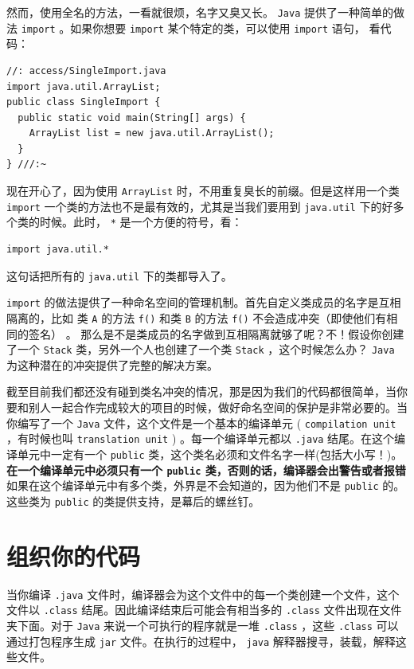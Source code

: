 \documentclass[10pt,a4paper,UTF8]{article}
\begin{document}
然而，使用全名的方法，一看就很烦，名字又臭又长。 \texttt{Java} 提供了一种简单的做法 \texttt{import} 。如果你想要 \texttt{import} 某个特定的类，可以使用 \texttt{import} 语句， 看代码：
\lstset{language=C,label= ,caption= ,captionpos=b,numbers=none}
\begin{lstlisting}
//: access/SingleImport.java
import java.util.ArrayList;
public class SingleImport {
  public static void main(String[] args) {
    ArrayList list = new java.util.ArrayList();
  }
} ///:~
\end{lstlisting}

现在开心了，因为使用 \texttt{ArrayList} 时，不用重复臭长的前缀。但是这样用一个类 \texttt{import} 一个类的方法也不是最有效的，尤其是当我们要用到 \texttt{java.util} 下的好多个类的时候。此时， \texttt{*} 是一个方便的符号，看：
\begin{verbatim}
import java.util.*
\end{verbatim}
这句话把所有的 \texttt{java.util} 下的类都导入了。

\texttt{import} 的做法提供了一种命名空间的管理机制。首先自定义类成员的名字是互相隔离的，比如 类 \texttt{A} 的方法 \texttt{f()} 和类 \texttt{B} 的方法 \texttt{f()} 不会造成冲突（即使他们有相同的签名） 。 那么是不是类成员的名字做到互相隔离就够了呢？不！假设你创建了一个 \texttt{Stack} 类，另外一个人也创建了一个类 \texttt{Stack} ，这个时候怎么办？ \texttt{Java} 为这种潜在的冲突提供了完整的解决方案。

截至目前我们都还没有碰到类名冲突的情况，那是因为我们的代码都很简单，当你要和别人一起合作完成较大的项目的时候，做好命名空间的保护是非常必要的。当你编写了一个 \texttt{Java} 文件，这个文件是一个基本的编译单元 ( \texttt{compilation unit} ，有时候也叫 \texttt{translation unit} ) 。每一个编译单元都以 \texttt{.java} 结尾。在这个编译单元中一定有一个 \texttt{public} 类，这个类名必须和文件名字一样(包括大小写！)。 \textbf{在一个编译单元中必须只有一个 \texttt{public} 类，否则的话，编译器会出警告或者报错} 如果在这个编译单元中有多个类，外界是不会知道的，因为他们不是 \texttt{public} 的。这些类为 \texttt{public} 的类提供支持，是幕后的螺丝钉。
\section{组织你的代码}
\label{sec:orgf824f1e}


当你编译 \texttt{.java} 文件时，编译器会为这个文件中的每一个类创建一个文件，这个文件以 \texttt{.class} 结尾。因此编译结束后可能会有相当多的 \texttt{.class} 文件出现在文件夹下面。对于 \texttt{Java} 来说一个可执行的程序就是一堆 \texttt{.class} ，这些 \texttt{.class} 可以通过打包程序生成 \texttt{jar} 文件。在执行的过程中， \texttt{java}  解释器搜寻，装载，解释这些文件。
\end{document}
